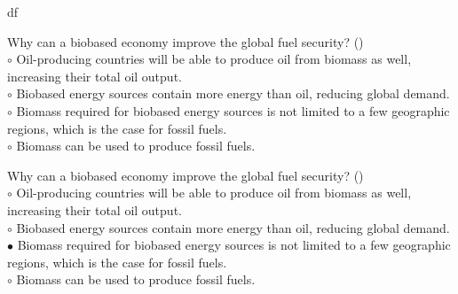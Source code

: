 df\documentclass[]{beamer}
\begin{document}
\begin{CJK}{UTF8}{gbsn}
\begin{frame}[shrink] {}
\addtocounter{questions}{1}
\color{blue}
Why can a biobased economy improve the global fuel security?
({})\\
\color{black}
\setlength{\parindent}{-0.4cm}
{\color{red}$\circ$} Oil-producing countries will be able to produce oil from biomass as well, increasing their total oil output.  \\
{\color{red}$\circ$} Biobased energy sources contain more energy than oil, reducing global demand.  \\
{\color{red}$\circ$}  Biomass required for biobased energy sources is not limited to a few geographic regions, which is the case for fossil fuels.  \\
{\color{red}$\circ$} Biomass can be used to produce fossil fuels.   \\
\end{frame}
\begin{frame}[shrink] {}
\addtocounter{answers}{1}
\color{blue}
Why can a biobased economy improve the global fuel security?
({})\\
\color{black}
\setlength{\parindent}{-0.4cm}
{\color{red}$\circ$} Oil-producing countries will be able to produce oil from biomass as well, increasing their total oil output.  \\
{\color{red}$\circ$} Biobased energy sources contain more energy than oil, reducing global demand.  \\
{\color{red}$\bullet$} Biomass required for biobased energy sources is not limited to a few geographic regions, which is the case for fossil fuels.  \\
{\color{red}$\circ$} Biomass can be used to produce fossil fuels.   \\
\end{frame}



\end{CJK}
\end{document}
